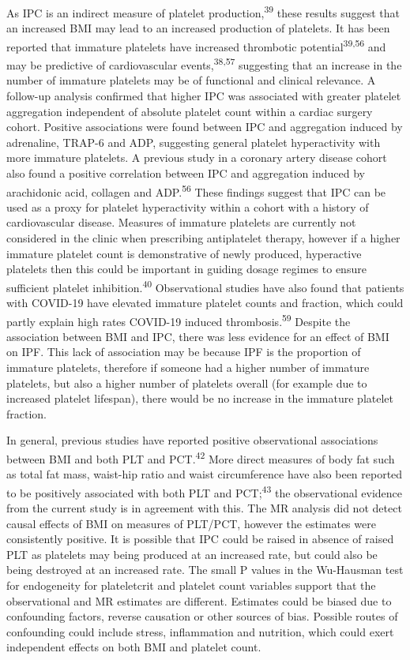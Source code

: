 \documentclass[11pt,twoside]{bristolthesis}
\begin{document}
As IPC is an indirect measure of platelet production,\textsuperscript{39} these results suggest that an increased BMI may lead to an increased production of platelets. It has been reported that immature platelets have increased thrombotic potential\textsuperscript{39,56} and may be predictive of cardiovascular events,\textsuperscript{38,57} suggesting that an increase in the number of immature platelets may be of functional and clinical relevance. A follow-up analysis confirmed that higher IPC was associated with greater platelet aggregation independent of absolute platelet count within a cardiac surgery cohort. Positive associations were found between IPC and aggregation induced by adrenaline, TRAP-6 and ADP, suggesting general platelet hyperactivity with more immature platelets. A previous study in a coronary artery disease cohort also found a positive correlation between IPC and aggregation induced by arachidonic acid, collagen and ADP.\textsuperscript{56} These findings suggest that IPC can be used as a proxy for platelet hyperactivity within a cohort with a history of cardiovascular disease. Measures of immature platelets are currently not considered in the clinic when prescribing antiplatelet therapy, however if a higher immature platelet count is demonstrative of newly produced, hyperactive platelets then this could be important in guiding dosage regimes to ensure sufficient platelet inhibition.\textsuperscript{40} Observational studies have also found that patients with COVID-19 have elevated immature platelet counts and fraction, which could partly explain high rates COVID-19 induced thrombosis.\textsuperscript{59} Despite the association between BMI and IPC, there was less evidence for an effect of BMI on IPF. This lack of association may be because IPF is the proportion of immature platelets, therefore if someone had a higher number of immature platelets, but also a higher number of platelets overall (for example due to increased platelet lifespan), there would be no increase in the immature platelet fraction.

In general, previous studies have reported positive observational associations between BMI and both PLT and PCT.\textsuperscript{42} More direct measures of body fat such as total fat mass, waist-hip ratio and waist circumference have also been reported to be positively associated with both PLT and PCT;\textsuperscript{43} the observational evidence from the current study is in agreement with this. The MR analysis did not detect causal effects of BMI on measures of PLT/PCT, however the estimates were consistently positive. It is possible that IPC could be raised in absence of raised PLT as platelets may being produced at an increased rate, but could also be being destroyed at an increased rate. The small P values in the Wu-Hausman test for endogeneity for plateletcrit and platelet count variables support that the observational and MR estimates are different. Estimates could be biased due to confounding factors, reverse causation or other sources of bias. Possible routes of confounding could include stress, inflammation and nutrition, which could exert independent effects on both BMI and platelet count.
\end{document}
